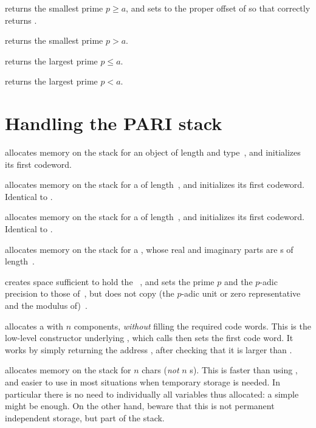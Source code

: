 returns the smallest prime $p \geq a$, and sets  to the proper offset
of  so that  correctly
returns .

 returns the smallest
prime $p > a$.

 returns the largest
prime $p \leq a$.

 returns the largest
prime $p < a$.

\section{Handling the PARI stack}


 allocates memory on the stack for
an object of length  and type~, and initializes its first
codeword.

 allocates memory on the stack for a 
of length~, and initializes its first codeword. Identical to
.

 allocates memory on the stack for a 
of length~, and initializes its first codeword. Identical to
.

 allocates memory on the stack for a
, whose real and imaginary parts are s
of length~.

 creates space sufficient to hold the
~, and sets the prime $p$ and the $p$-adic precision to
those of~, but does not copy (the $p$-adic unit or zero representative
and the modulus of)~.

 allocates a  with $n$ components,
\emph{without} filling the required code words. This is the low-level
constructor underlying , which calls  then sets
the first code word. It works by simply returning the address
, after checking that it is larger than .

 allocates memory on the stack for $n$
chars (\emph{not} $n$ s). This is faster than using ,
and easier to use in most situations when temporary storage is needed. In
particular there is no need to  individually all variables thus
allocated: a simple  might be enough. On the other hand,
beware that this is not permanent independent storage, but part of the stack.


